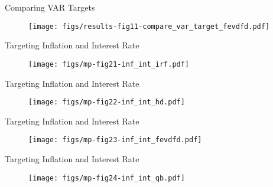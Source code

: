 \begin{frame}{Comparing VAR Targets}

  \begin{figure}
    \texttt{[image: figs/results-fig11-compare\_var\_target\_fevdfd.pdf]}
  \end{figure}

\end{frame}


\begin{frame}{Targeting Inflation and Interest Rate}

  \begin{figure}
    \texttt{[image: figs/mp-fig21-inf\_int\_irf.pdf]}
  \end{figure}

\end{frame}


\begin{frame}{Targeting Inflation and Interest Rate}

  \begin{figure}
    \texttt{[image: figs/mp-fig22-inf\_int\_hd.pdf]}
  \end{figure}

\end{frame}



\begin{frame}{Targeting Inflation and Interest Rate}

  \begin{figure}
    \texttt{[image: figs/mp-fig23-inf\_int\_fevdfd.pdf]}
  \end{figure}

\end{frame}

\begin{frame}{Targeting Inflation and Interest Rate}

  \begin{figure}
    \texttt{[image: figs/mp-fig24-inf\_int\_qb.pdf]}
  \end{figure}

\end{frame}



